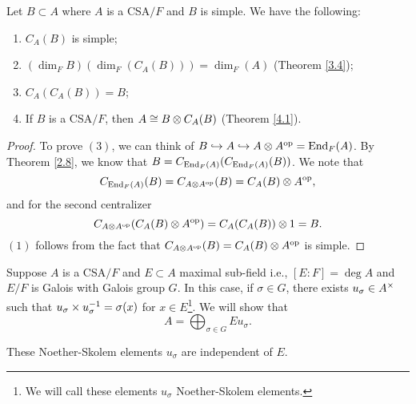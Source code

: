 \begin{theorem}\label{4.2}
Let $B \subset A$ where $A$ is a CSA$/F$
 and $B$ is simple. We have the following:
 \begin{enumerate}
 \item $C_A(B)$ is simple;
 \item $(\dim_FB)(\dim_F(C_A(B))) = \dim_F(A)$ (Theorem \ref{3.4});
 \item $C_A(C_A(B))= B$;
 \item If $B$ is a CSA$/F$, then $A \cong B \otimes C_A(B)$ (Theorem \ref{4.1}). 
 \end{enumerate}
\end{theorem}
\begin{proof}
To prove $(3)$, we can think of $B \hookrightarrow A \hookrightarrow A\otimes A^{\operatorname{op}} = \operatorname{End}_F(A)$. By Theorem \ref{2.8}, we know that 
$B = C_{\operatorname{End}_F(A)}(C_{\operatorname{End}_F(A)}(B))$. We note that 
$$C_{\operatorname{End}_F(A)}(B) = C_{A\otimes A^{\operatorname{op}}}(B) = C_A(B) \otimes A^{\operatorname{op}},$$
and for the second centralizer
$$C_{A\otimes A^{\operatorname{op}}}(C_A(B) \otimes A^{\operatorname{op}}) = C_A(C_A(B)) \otimes 1 = B.$$ 
$(1)$ follows from the fact that $C_{A\otimes A^{\operatorname{op}}}(B) = C_A(B) \otimes A^{\operatorname{op}}$ is simple.
\end{proof}
Suppose $A$ is a CSA$/F$ and $E \subset A $ maximal sub-field i.e., $[E:F] = \deg A$ and $E/F$ is Galois with Galois group $G$. In this case, if $\sigma \in G$, there exists $u_{\sigma} \in A^{\times}$ such that $u_{\sigma} \times u_{\sigma}^{-1} = \sigma (x)$ for $x \in E$\footnote{We will call these elements $u_{\sigma}$ Noether-Skolem elements.}. We will show that $$A = \bigoplus_{\sigma \in G}Eu_{\sigma}.$$

\begin{lemma}\label{4.3}
These Noether-Skolem elements $u_{\sigma}$ are independent of $E$.
\end{lemma}

